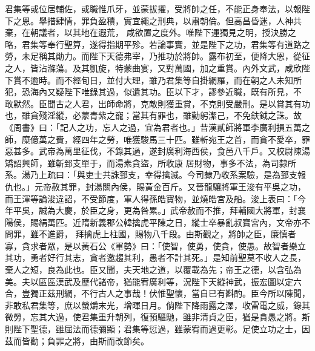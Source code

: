 \begin{pinyinscope}
 君集等或位居輔佐，或職惟爪牙，並蒙拔擢，受將帥之任，不能正身奉法，以報陛下之恩。舉措肆情，罪負盈積，實宜繩之刑典，以肅朝倫。但高昌昏迷，人神共棄，在朝議者，以其地在遐荒，
 咸欲置之度外。唯陛下運獨見之明，授決勝之略，君集等奉行聖算，遂得指期平殄。若論事實，並是陛下之功，君集等有道路之勞，未足稱其勛力。而陛下天德弗宰，乃推功於將帥。露布初至，便降大恩，從征之人，皆沾滌蕩。及其凱旋，特蒙曲宴，又對萬國，加之重賞。內外文武，咸欣陛下賞不逾時。而不經旬日，並付大理，雖乃君集等自掛網羅，而在朝之人未知所犯，恐海內又疑陛下唯錄其過，似遺其功。臣以下才，謬參近職，既有所見，不
 敢默然。臣聞古之人君，出師命將，克敵則獲重賞，不克則受嚴刑。是以賞其有功也，雖貪殘淫縱，必蒙青紫之寵；當其有罪也，雖勤躬潔己，不免鈇鉞之誅。故《周書》曰：「記人之功，忘人之過，宜為君者也。」昔漢貳師將軍李廣利損五萬之師，糜億萬之費，經四年之勞，唯獲駿馬三十匹。雖斬宛王之首，而貪不愛卒，罪惡甚多。武帝為萬里征伐，不錄其過，遂封廣利海西侯，食邑八千戶。又校尉陳湯矯詔興師，雖斬郅支單于，而湯素貪盜，所收康
 居財物，事多不法，為司隸所系。湯乃上疏曰：「與吏士共誅郅支，幸得擒滅。今司隸乃收系案驗，是為郅支報仇也。」元帝赦其罪，封湯關內侯，賜黃金百斤。又晉龍驤將軍王浚有平吳之功，而王渾等論浚違詔，不受節度，軍人得孫皓寶物，並燒皓宮及船。浚上表曰：「今年平吳，誠為大慶，於臣之身，更為咎累。」武帝赦而不推，拜輔國大將軍，封襄陽侯，賜絹萬匹。近隋新義郡公韓擒虎平陳之日，縱士卒暴亂叔寶宮內，文帝亦不問罪，雖不進爵，
 拜擒虎上柱國，賜物八千段。由斯觀之，將帥之臣，廉慎者寡，貪求者眾，是以黃石公《軍勢》曰：「使智，使勇，使貪，使愚。故智者樂立其功，勇者好行其志，貪者邀趨其利，愚者不計其死。」是知前聖莫不收人之長，棄人之短，良為此也。臣又聞，夫天地之道，以覆載為先；帝王之德，以含弘為美。夫以區區漢武及歷代諸帝，猶能宥廣利等，況陛下天縱神武，振宏圖以定六合，豈獨正茲刑網，不行古人之事哉！伏惟聖懷，當自已有斟酌。臣今所以陳聞，
 非敢私君集等，庶以螢爝末光，增暉日月。倘陛下降雨露之澤，收雷電之威，錄其微勞，忘其大過，使君集重升朝列，復預驅馳，雖非清貞之臣，猶是貪愚之將。斯則陛下聖德，雖屈法而德彌顯；君集等愆過，雖蒙宥而過更彰。足使立功之士，因茲而皆勸；負罪之將，由斯而改節矣。




\end{pinyinscope}
